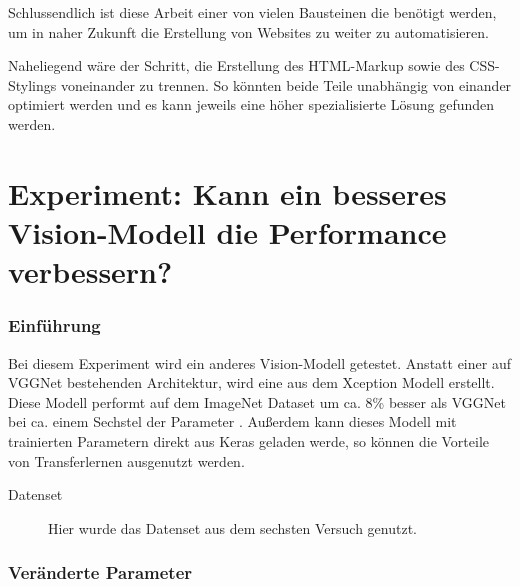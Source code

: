 \documentclass[pdftex,a4paper,halfparskip, article]{scrartcl}
\begin{document}
Schlussendlich ist diese Arbeit einer von vielen Bausteinen die benötigt werden, um in naher Zukunft die Erstellung von Websites zu weiter zu automatisieren. 

Naheliegend wäre der Schritt, die Erstellung des HTML-Markup sowie des CSS-Stylings voneinander zu trennen. So könnten beide Teile unabhängig von einander optimiert werden und es kann jeweils eine höher spezialisierte Lösung gefunden werden.



\newpage

 

\appendix

\section{Experiment: Kann ein besseres Vision-Modell die Performance verbessern?}\label{sub:exception}

\subsubsection*{Einführung}

Bei diesem Experiment wird ein anderes Vision-Modell getestet. Anstatt einer auf VGGNet bestehenden Architektur, wird eine aus dem Xception \cite{DBLP:journals/corr/Chollet16a} Modell erstellt. Diese Modell performt auf dem ImageNet Dataset um ca. 8\% besser als VGGNet bei ca. einem Sechstel der Parameter \cite{kerasModels}. Außerdem kann dieses Modell mit trainierten Parametern direkt aus Keras geladen werde, so können die Vorteile von Transferlernen ausgenutzt werden. 

\begin{description}
	\item[Datenset] Hier wurde das Datenset aus dem sechsten Versuch genutzt.
\end{description}

\subsubsection*{Veränderte Parameter}
\end{document}
